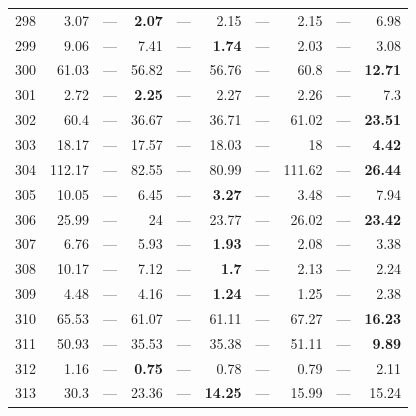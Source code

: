 \begin{longtable}{lr@{\hskip 4pt}l@{\hskip 12pt}r@{\hskip 4pt}l@{\hskip 12pt}r@{\hskip 4pt}l@{\hskip 12pt}r@{\hskip 4pt}l@{\hskip 12pt}r}
298 & 3.07 & --- & \textbf{2.07} & --- & 2.15 & --- & 2.15 & --- & 6.98 \\
299 & 9.06 & --- & 7.41 & --- & \textbf{1.74} & --- & 2.03 & --- & 3.08 \\
300 & 61.03 & --- & 56.82 & --- & 56.76 & --- & 60.8 & --- & \textbf{12.71} \\
301 & 2.72 & --- & \textbf{2.25} & --- & 2.27 & --- & 2.26 & --- & 7.3 \\
302 & 60.4 & --- & 36.67 & --- & 36.71 & --- & 61.02 & --- & \textbf{23.51} \\
303 & 18.17 & --- & 17.57 & --- & 18.03 & --- & 18 & --- & \textbf{4.42} \\
304 & 112.17 & --- & 82.55 & --- & 80.99 & --- & 111.62 & --- & \textbf{26.44} \\
305 & 10.05 & --- & 6.45 & --- & \textbf{3.27} & --- & 3.48 & --- & 7.94 \\
306 & 25.99 & --- & 24 & --- & 23.77 & --- & 26.02 & --- & \textbf{23.42} \\
307 & 6.76 & --- & 5.93 & --- & \textbf{1.93} & --- & 2.08 & --- & 3.38 \\
308 & 10.17 & --- & 7.12 & --- & \textbf{1.7} & --- & 2.13 & --- & 2.24 \\
309 & 4.48 & --- & 4.16 & --- & \textbf{1.24} & --- & 1.25 & --- & 2.38 \\
310 & 65.53 & --- & 61.07 & --- & 61.11 & --- & 67.27 & --- & \textbf{16.23} \\
311 & 50.93 & --- & 35.53 & --- & 35.38 & --- & 51.11 & --- & \textbf{9.89} \\
312 & 1.16 & --- & \textbf{0.75} & --- & 0.78 & --- & 0.79 & --- & 2.11 \\
313 & 30.3 & --- & 23.36 & --- & \textbf{14.25} & --- & 15.99 & --- & 15.24 \\
\bottomrule
\end{longtable}